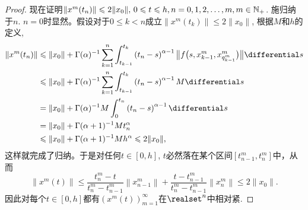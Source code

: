 \begin{proof}
    现在证明$\|x^m(t_n)\|\leqslant 2\|x_0\|,\,0\leqslant t\leqslant h,n=0,1,2,\dots,m,m\in \mathbb{N_+}$. 施归纳于$n$. $n=0$时显然。假设对于$0\leqslant k<n$成立$\|x^m(t_k)\|\leqslant 2\|x_0\|$, 根据$M$和$h$的定义,
    \begin{align*}
        \left\|x^m(t_n)\right\|&\leqslant \|x_0\|+\Gamma(\alpha)^{-1}\sum_{k=1}^{n}\int_{t_{k-1}}^{t_k} \left(t_n-s\right)^{\alpha-1} \bigl\|f\bigl(s,x^m_{k-1},x^m_{q^m_{k-1}}\bigr)\bigr\| \differential s
        \\ &\leqslant \|x_0\|+\Gamma(\alpha)^{-1} \sum_{k=1}^{n}\int_{t_{k-1}}^{t_k} \left(t_n-s\right)^{\alpha-1} M \differential s
        \\ &= \|x_0\|+\Gamma(\alpha)^{-1} M \int_{0}^{t_n} \left(t_n-s\right)^{\alpha-1} \differential s
        \\ &= \|x_0\|+\Gamma(\alpha+1)^{-1} M t_n^\alpha
        \\ &\leqslant \|x_0\|+\Gamma(\alpha+1)^{-1} M h^\alpha
        \leqslant 2\|x_0\|,
    \end{align*}
    这样就完成了归纳。于是对任何$t\in [0,h]$, $t$必然落在某个区间$\left[t^m_{n-1},t^m_n\right]$中，从而
    \begin{equation*}
        \left\|x^m(t)\right\|\leqslant \frac{t^m_n-t}{t^m_n-t^m_{n-1}}\left\|x^m_{n-1}\right\|+\frac{t-t^m_{n-1}}{t^m_n-t^m_{n-1}}\left\|x^m_{n}\right\|\leqslant 2\|x_0\|.
    \end{equation*}
    因此对每个$t\in [0,h]$都有$\left(x^m(t)\right)_{m=1}^\infty$在$\realset^n$中相对紧.


\end{proof}
